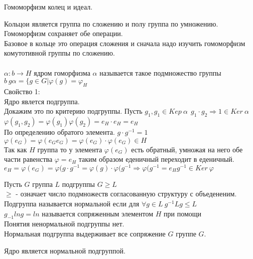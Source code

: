 \begin{title}
	Гомоморфизм колец и идеал.
\end{title}

Кольцои является группа по сложению и полу группа по умножению.\\
Гомоморфизм сохраняет обе операции.\\
Базовое в кольце это операция сложения и сначала надо изучить гомоморфизм
комутотивной группы по сложению.\\


\\

$\alpha : b \to H$ ядром гоморфизма $\alpha$ называется такое подмножество
группы $b ~ g\alpha = \{g \in G| \varphi (g) = \varphi_H$\\
Свойство 1:\\
Ядро явлется подгруппа.\\
Докажим это по критерию подгруппы. Пусть $g_1,g_1 \in Kep~\alpha
~~ g_1 \cdot g_2 \Rightarrow 1 \in Ker~\alpha$ $\varphi(g_1,g_2) =
\varphi (g_1)\varphi (g_2) = e_H \cdot e_H = e_H$\\
По определению обратого элемента. $g\cdot g^{-1} = 1$\\
$\varphi(e_G) = \varphi(e_G e_G) = \varphi(e_G) \cdot \varphi(e_G) \in H$\\
Так как $H$ группа то у элемента $\varphi(e_G)$ есть обратный, умножая на него
обе части равенства $\varphi = e_H$ таким образом еденичный переходит в
еденичный.\\
$e_H = \varphi(e_G) = \varphi(g\cdot g^{-1} = \varphi(g)\cdot \varphi(g^{-1}
\Rightarrow \varphi(g^{-1} = e_H g^{-1} \in Ker~\varphi$\\

\begin{defin}
	Пусть $G$ группа $L$ подгруппы $G \ge L$\\
	$\ge$ - означает число подмножеств согласованную структуру с объедененим.\\
	Подгруппа называется нормальной если для $\forall g \in L ~ g^{-1} Lg \le L$\\
	$g_{-1} lng = ln$ называется сопряженным элементом $H$ при помощи\\
	Понятия ненормальной подгруппы нет.\\
	Нормальная подгруппа выдерживает все сопряжение $G$ группе $G$.
\end{defin}

\begin{defin}
	Ядро является нормальной подгруппой.
\end{defin}

